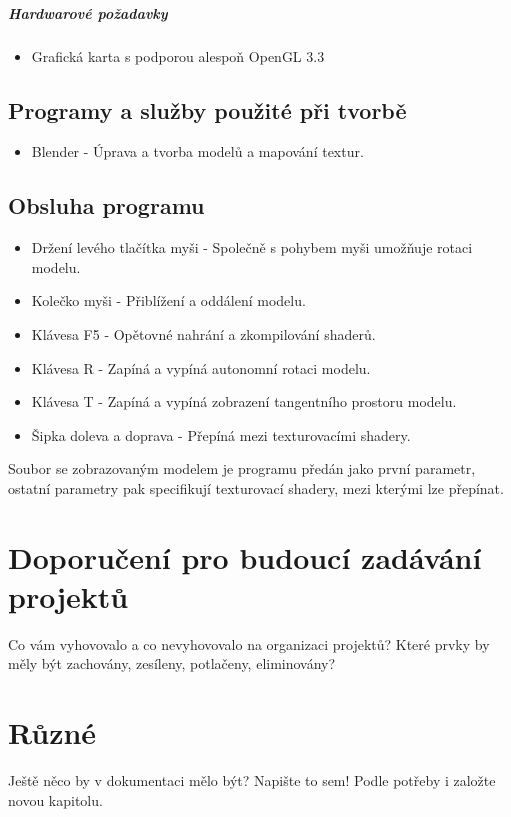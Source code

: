 \documentclass[12pt,a4paper,titlepage,final]{report}
\begin{document}
\paragraph{Hardwarové požadavky}
\begin{itemize}
	\item Grafická karta s podporou alespoň OpenGL 3.3
\end{itemize}

\section{Programy a služby použité při tvorbě}
\begin{itemize}
	\item Blender - Úprava a tvorba modelů a mapování textur.
\end{itemize}

\section{Obsluha programu}
\begin{itemize}
	\item Držení levého tlačítka myši - Společně s pohybem myši umožňuje rotaci modelu.
	\item Kolečko myši - Přiblížení a oddálení modelu.
	\item Klávesa F5 - Opětovné nahrání a zkompilování shaderů.
	\item Klávesa R - Zapíná a vypíná autonomní rotaci modelu.
	\item Klávesa T - Zapíná a vypíná zobrazení tangentního prostoru modelu.
	\item Šipka doleva a doprava - Přepíná mezi texturovacími shadery.
\end{itemize}

Soubor se zobrazovaným modelem je programu předán jako první parametr, ostatní parametry pak specifikují texturovací shadery, mezi kterými lze přepínat.

\chapter{Doporučení pro budoucí zadávání projektů}

Co vám vyhovovalo a co nevyhovovalo na organizaci projektů? Které prvky by měly být zachovány, zesíleny, potlačeny, eliminovány?


\chapter{Různé}

Ještě něco by v dokumentaci mělo být? Napište to sem! Podle potřeby i založte
novou kapitolu.



\nocite{gustavson2014,mcewan2012}

\end{document}
